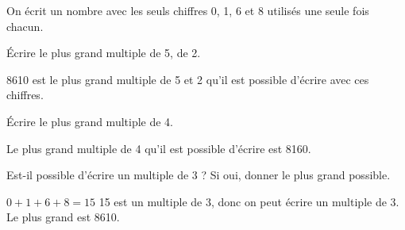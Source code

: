 \documentclass[a4paper,11pt]{exam}
\begin{document}
On écrit un nombre avec les seuls chiffres 0, 1, 6 et 8 utilisés une seule fois chacun.
\begin{questions}
	\question \'Ecrire le plus grand multiple de 5, de 2.
	\begin{solution}
		\num{8610} est le plus grand multiple de 5 et 2 qu'il est possible d'écrire avec ces chiffres.
	\end{solution}
	
	\question \'Ecrire le plus grand multiple de 4.
	\begin{solution}
		Le plus grand multiple de 4 qu'il est possible d'écrire est \num{8160}.
	\end{solution}
	
	\question Est-il possible d'écrire un multiple de 3 ? Si oui, donner le plus grand possible.
	\begin{solution}
		$ 0 + 1 + 6 + 8 = 15$ 15 est un multiple de 3, donc on peut écrire un multiple de 3. Le plus grand est \num{8610}.
	\end{solution}
\end{questions}
\end{document}
